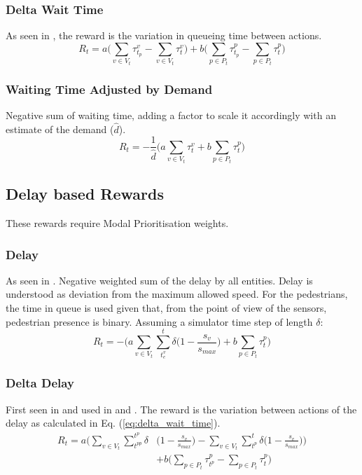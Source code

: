 \documentclass[a4paper, conference]{IEEEtran}
\begin{document}
\subsubsection{Delta Wait Time}
As seen in \cite{liang2017}, the reward is the variation in queueing time between actions.
\begin{equation}
R_t = a \bigg( \sum_{v \in V_t} \tau^v_{t_p} -  \sum_{v \in V_t} \tau^v_{t} \bigg) + b \bigg( \sum_{p \in P_t} \tau^p_{t_p} -  \sum_{p \in P_t} \tau^p_{t} \bigg)
\label{eq:delta_wait_time}
\end{equation}

\subsubsection{Waiting Time Adjusted by Demand}
Negative sum of waiting time, adding a factor to scale it accordingly with an estimate of the demand ($\hat{d}$).
\begin{equation}
   R_t = -\frac{1}{\hat{d}} \bigg( a \sum_{v \in V_t} \tau^v_{t} + b \sum_{p \in P_t} \tau^p_{t} \bigg)
\label{eq:wait_time_norm} 
\end{equation}

\subsection{Delay based Rewards}
These rewards require Modal Prioritisation weights.
\subsubsection{Delay}
As seen in \cite{wan2018}. Negative weighted sum of the delay by all entities. Delay is understood as deviation from the maximum allowed speed. 
For the pedestrians, the time in queue is used given that, from the point of view of the sensors, pedestrian presence is binary.
Assuming a simulator time step of length $\delta$:
\begin{equation}
    R_t = - \bigg( a \sum_{v \in V_t}  \sum_{t^v_e}^t \delta \big( 1-\frac{s_v}{s_{max}} \big) + b \sum_{p \in P_t} \tau^p_t \bigg)
\label{eq:delay}
\end{equation}

\subsubsection{Delta Delay}
First seen in \cite{abdulhai2010} and used in \cite{genders2016} \cite{gao2017} \cite{mousavi2017} and \cite{gendersstate}.
The reward is the variation between actions of the delay as calculated in Eq. (\ref{eq:delta_wait_time}).
\begin{equation}
\begin{split}
R_t =  a \bigg( \sum_{v \in V_t} \sum_{t^{pp}}^{t^p} \delta & \big( 1-\frac{s_v}{s_{max}} \big) - \sum_{v \in V_t}  \sum_{t^p}^t \delta \big( 1-\frac{s_v}{s_{max}} \big) \bigg) \\
& + b \bigg( \sum_{p \in P_t} \tau^p_{t^p} - \sum_{p \in P_t} \tau^p_{t} \bigg) 
\end{split}
\label{eq:changedelay} 
\end{equation}
\end{document}
